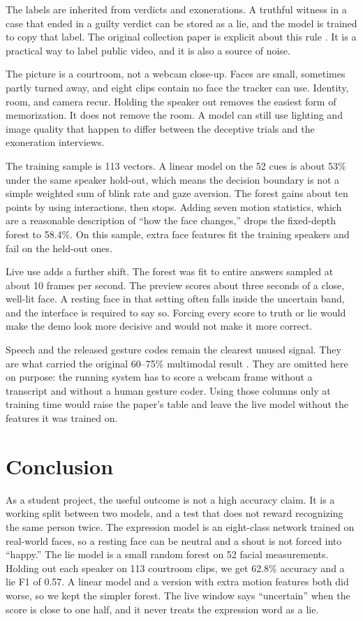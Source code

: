 \documentclass[conference]{IEEEtran}
\begin{document}
The labels are inherited from verdicts and exonerations. A truthful witness in a case that ended in a guilty verdict can be stored as a lie, and the model is trained to copy that label. The original collection paper is explicit about this rule \cite{perez2015trial}. It is a practical way to label public video, and it is also a source of noise.

The picture is a courtroom, not a webcam close-up. Faces are small, sometimes partly turned away, and eight clips contain no face the tracker can use. Identity, room, and camera recur. Holding the speaker out removes the easiest form of memorization. It does not remove the room. A model can still use lighting and image quality that happen to differ between the deceptive trials and the exoneration interviews.

The training sample is 113 vectors. A linear model on the 52 cues is about 53\% under the same speaker hold-out, which means the decision boundary is not a simple weighted sum of blink rate and gaze aversion. The forest gains about ten points by using interactions, then stops. Adding seven motion statistics, which are a reasonable description of ``how the face changes,'' drops the fixed-depth forest to 58.4\%. On this sample, extra face features fit the training speakers and fail on the held-out ones.

Live use adds a further shift. The forest was fit to entire answers sampled at about 10 frames per second. The preview scores about three seconds of a close, well-lit face. A resting face in that setting often falls inside the uncertain band, and the interface is required to say so. Forcing every score to truth or lie would make the demo look more decisive and would not make it more correct.

Speech and the released gesture codes remain the clearest unused signal. They are what carried the original 60--75\% multimodal result \cite{perez2015trial}. They are omitted here on purpose: the running system has to score a webcam frame without a transcript and without a human gesture coder. Using those columns only at training time would raise the paper's table and leave the live model without the features it was trained on.

\section{Conclusion}
As a student project, the useful outcome is not a high accuracy claim. It is a working split between two models, and a test that does not reward recognizing the same person twice. The expression model is an eight-class network trained on real-world faces, so a resting face can be neutral and a shout is not forced into ``happy.'' The lie model is a small random forest on 52 facial measurements. Holding out each speaker on 113 courtroom clips, we get 62.8\% accuracy and a lie F1 of 0.57. A linear model and a version with extra motion features both did worse, so we kept the simpler forest. The live window says ``uncertain'' when the score is close to one half, and it never treats the expression word as a lie.
\end{document}
